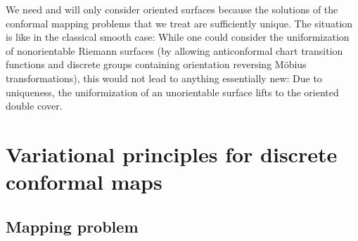 \documentclass[Thesis.tex]{subfiles}
\begin{document}
\begin{remark*}[Orientation]
We need and will only consider oriented surfaces because the
solutions of the conformal mapping problems that we treat are
sufficiently unique. The situation is like in the classical smooth
case: While one could consider the uniformization of nonorientable
Riemann surfaces (by allowing anticonformal chart transition
functions and discrete groups containing orientation reversing
M\"obius transformations), this would not lead to anything
essentially new: Due to uniqueness, the uniformization of an
unorientable surface lifts to the oriented double cover.
\end{remark*}



\section{Variational principles for discrete conformal maps}
\label{sec:vari-princ}


\subsection{Mapping problem}
\label{sec:mapping_problem}
\end{document}
